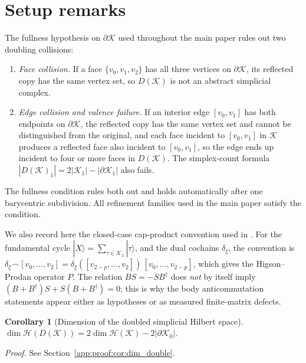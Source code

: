 \documentclass[11pt]{article}
\numberwithin{equation}{section}
\newtheorem{corollary}[theorem]{Corollary}
\theoremstyle{definition}
\theoremstyle{remark}
\newcommand{\proofref}[1]{%
  \par\noindent\emph{Proof.} See Section~\ref{#1}.\par\medskip
}
\newcommand{\proofappendixref}[1]{\proofref{#1}}
\newcommand{\K}{\mathcal{K}}
\newcommand{\Hil}{\mathcal{H}}
\newcommand{\bd}{\partial}
\begin{document}
\section{Setup remarks}\label{sec:setup_remarks}

The fullness hypothesis on $\bd\K$ used throughout the main paper rules out two doubling
collisions:
\begin{enumerate}[label=(\roman*),leftmargin=2em]
\item \emph{Face collision.} If a face $\{v_0,v_1,v_2\}$ has all three vertices on $\bd\K$, its
  reflected copy has the same vertex set, so $D(\K)$ is not an abstract simplicial complex.
\item \emph{Edge collision and valence failure.} If an interior edge $[v_0,v_1]$ has both
  endpoints on $\bd\K$, the reflected copy has the same vertex set and cannot be distinguished
  from the original, and each face incident to $[v_0,v_1]$ in $\K$ produces a reflected face
  also incident to $[v_0,v_1]$, so the edge ends up incident to four or more faces in $D(\K)$.
  The simplex-count formula $|D(\K)_1|=2|\K_1|-|\bd\K_1|$ also fails.
\end{enumerate}
The fullness condition rules both out and holds automatically after one barycentric subdivision.
All refinement families used in the main paper satisfy the condition.

We also record here the closed-case cap-product convention used in . For the
fundamental cycle $|X\rangle=\sum_{\tau\in\K_2}|\tau\rangle$, and the dual cochains
\(\delta_\xi\), the convention is
\(\delta_\xi\frown[v_0,\dots,v_2]=\delta_\xi([v_{2-p},\dots,v_2])\,[v_0,\dots,v_{2-p}]\),
which gives the Higson--Prodan operator $P$. The relation $BS=-SB^\dagger$ does \emph{not} by
itself imply $(B+B^\dagger)S+S(B+B^\dagger)=0$; this is why the body anticommutation statements
appear either as hypotheses or as measured finite-matrix defects.


\begin{corollary}[Dimension of the doubled simplicial Hilbert space]\label{cor:dim_double}
\(\dim\Hil(D(\K))=2\dim\Hil(\K)-2|\bd\K_0|\).
\end{corollary}
\proofappendixref{app:proof:cor:dim_double}
\end{document}
